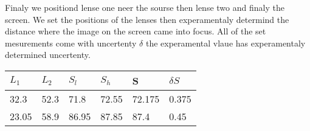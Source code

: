 \documentclass[12pt,a4paper]{article}
\begin{document}
Finaly we positiond lense one neer the sourse then lense two and finaly the screen.  We set the positions of the lenses then experamentaly determind the distance where the image on the screen came into focus.  All of the set mesurements come with uncertenty $\delta$ the experamental vlaue has experamentaly determined uncertenty.\\

\begin{tabular}{| l | l | l | l | l | l |}
\hline
$L_1$ & $L_2$ & $S_l$ & $S_h$ & S & $\delta S$\\
\hline
32.3 & 52.3 & 71.8 & 72.55 & 72.175 & 0.375\\
\hline
23.05 & 58.9 & 86.95 & 87.85 & 87.4 & 0.45\\
\hline

\end{tabular}
\end{document}
